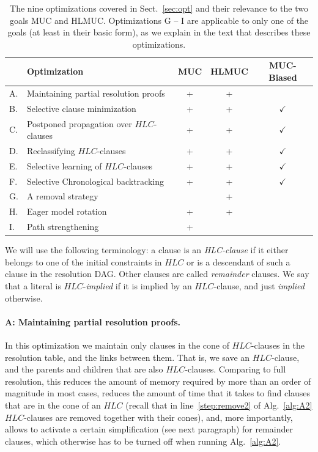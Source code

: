 \documentclass[twoside,11pt]{article}
\begin{document}
\begin{table}
\setlength{\abovecaptionskip}{15pt }
\begin{center}
\caption{The nine optimizations covered in Sect.~\ref{sec:opt} and their
relevance to the two goals MUC and HLMUC. Optimizations G -- I are applicable to only one of the
goals (at least in their basic form), as we explain in the text that
describes these optimizations.}\label{fig:table}
\begin{tabular}{llccc} \hline
   & Optimization  &   MUC & HLMUC  & MUC-Biased\\ \hline
A. & Maintaining partial resolution proofs & + & + &  \\
B. & Selective clause minimization &  + & +   & $\checkmark$\\
C. & Postponed propagation over $HLC$-clauses & + & +  & $\checkmark$ \\
D. & Reclassifying $HLC$-clauses & + & +  & $\checkmark$ \\
E. & Selective learning of $HLC$-clauses & + & +  & $\checkmark$\\
F. & Selective Chronological backtracking & + & +  & $\checkmark$\\
G. & A removal strategy & & + & \\
H. & Eager model rotation & + & + & \\
I. & Path strengthening & + & & \\ \hline
\end{tabular}
\end{center}
\end{table}




We will use the following terminology: a clause is an \emph{HLC-clause} if it
either belongs to one of the initial constraints in $HLC$ or is a descendant
of such a clause in the resolution DAG. Other clauses are called
\emph{remainder} clauses. We say that a literal is $HLC$-\emph{implied} if it
is implied by an $HLC$-clause, and just \emph{implied} otherwise.


\paragraph{A: Maintaining partial resolution proofs.} In this optimization we maintain only clauses in the cone of $HLC$-clauses in the resolution table, and the links between them. That is, we save an $HLC$-clause, and the parents and children that are also $HLC$-clauses.
Comparing to full resolution, this reduces the amount of memory required by more than an order of magnitude in most cases, reduces the amount of time that it takes to find clauses that are in the cone of an $HLC$ (recall that in line~\ref{step:remove2} of Alg.~\ref{alg:A2} $HLC$-clauses are removed together with their cones), and, more importantly, allows to activate a certain simplification (see next paragraph) for remainder clauses, which otherwise has to be turned off when running Alg.~\ref{alg:A2}.
\end{document}
